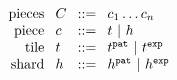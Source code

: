 \begin{figure}[h]
  \[\arraycolsep=4pt\begin{array}{rlrl}

    \text{pieces} & \selection & ::= &
    \selem_1\dots\selem_n \\
    \text{piece} & \selem & ::= &
      \tile ~\vert~
      \shard \\

    \text{tile} & \tile & ::= &
       \tile^{\pat} ~\vert~
       \tile^{\expr} \\

    \text{shard} & \shard & ::= &
      \shard^{\pat} ~\vert~
      \shard^{\expr} \\
  \end{array}\]
\end{figure}